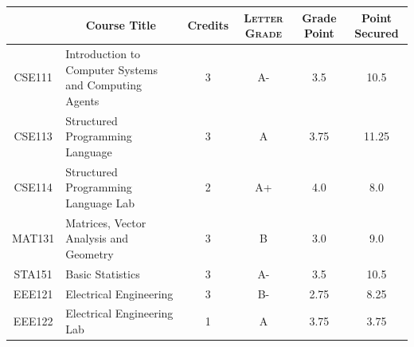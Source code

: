 \documentclass[11pt]{article}
\newcommand*{\numtwo}[1]{\pgfmathprintnumber[
                    fixed, precision=2, fixed zerofill=true]{#1}}
\begin{document}
                \begin{center}
                    \renewcommand{\arraystretch}{1.08}
                    
                \begin{tabular}{|c|l|c|>{\scshape}c|c|c|}
                \hline  \rule[-1ex]{0pt}{3.5ex} {\centering{\bf Course Code}} &  \multicolumn{1}{c|}{\textbf{Course Title}}  & {\bf Credits} & {\bf Letter Grade} & {\bf Grade Point} & {\bf Point Secured}  \\ 
                \hline   CSE111 &  Introduction to Computer Systems and Computing Agents		 & 3 & A- & 3.5 & 10.5 \\ %
                \hline   CSE113 &  Structured Programming Language		 & 3 & A & 3.75 & 11.25 \\ %
                \hline   CSE114 &  Structured Programming Language Lab		 & 2 & A+ & 4.0 & 8.0 \\ %
                \hline   MAT131 &  Matrices, Vector Analysis and Geometry		 & 3 & B & 3.0 & 9.0 \\ %
                \hline   STA151 &  Basic Statistics		 & 3 & A- & 3.5 & 10.5 \\ %
                \hline   EEE121 &  Electrical Engineering		 & 3 & B- & 2.75 & 8.25 \\ %
                \hline   EEE122 &  Electrical Engineering Lab		 & 1 & A & 3.75 & 3.75 \\ %

\hline                %
                \end{tabular}
                \end{center}
                \renewcommand{\arraystretch}{1.03}
\end{document}
